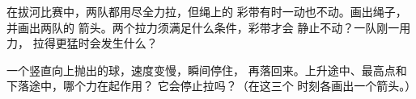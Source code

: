 \begin{exercise}[$\star\star$]\label{exo:g2:pushes-and-pulls:9}
在拔河比赛中，两队都用尽全力拉，但绳上的
彩带有时一动也不动。画出绳子，并画出两队的
箭头。两个拉力须满足什么条件，彩带才会
静止不动？一队刚一用力，
拉得更猛时会发生什么？
\end{exercise}

\begin{exercise}[$\star\star$]\label{exo:g2:pushes-and-pulls:10}
一个竖直向上抛出的球，速度变慢，瞬间停住，
再落回来。上升途中、最高点和下落途中，哪个力在起作用？
它会停止拉吗？（在这三个
时刻各画出一个箭头。）
\end{exercise}
